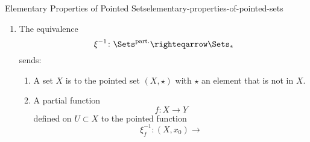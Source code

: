 \begin{proposition}{Elementary Properties of Pointed Sets}{elementary-properties-of-pointed-sets}
\begin{enumerate}
\begin{enumerate}
\[                        \righteqarrow%
                        \Sets^{\mathrm{part.}}%
                    \]%
                    sends:
                    \begin{enumerate}
                        \item A pointed set $(X,x_{0})$ to $X$.
                        \item A pointed function
                            \[
                                f%
                                \colon%
                                (X,x_{0})%
                                \to%
                                (Y,y_{0})%
                            \]%
                             to the partial function
                            \[
                                \xi_{f}%
                                \colon%
                                X%
                                \to%
                                Y%
                            \]%
                            defined on $f^{-1}(Y\setminus y_{0})$ and given by
                            \[
                                \xi_{f}(x)%
                                \defeq%
                                f(x)%
                            \]%
                            for each $x\in f^{-1}(Y\setminus y_{0})$.
                    \end{enumerate}
                \item{}The equivalence
                    \[
                        \xi^{-1}%
                        \colon%
                        \Sets^{\mathrm{part.}}%
                        \righteqarrow%
                        \Sets_{*}%
                    \]%
                    sends:
                    \begin{enumerate}
                        \item A set $X$ is to the pointed set $(X,\star)$ with $\star$ an element that is not in $X$.
                        \item A partial function
                            \[
                                f%
                                \colon%
                                X%
                                \to%
                                Y%
                            \]%
                            defined on $U\subset X$ to the pointed function
                            \[
                                \xi^{-1}_{f}%
                                \colon%
                                (X,x_{0})%
                                \to%
\]
\end{enumerate}
\end{enumerate}
\end{enumerate}
\end{proposition}
